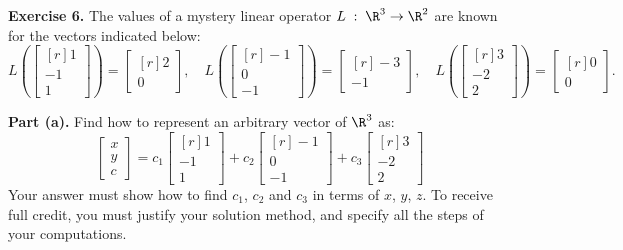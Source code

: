 \documentclass[12pt]{article}
\begin{document}
\textbf{Exercise 6.} The values of a mystery linear operator $L\;:\;\R^3\to\R^2$ are known for the vectors indicated below:
\[
L\left(\begin{bmatrix*}[r] 1\\ -1\\ 1\end{bmatrix*}\right)=\begin{bmatrix*}[r] 2\\ 0\end{bmatrix*},\quad
L\left(\begin{bmatrix*}[r] -1\\ 0\\-1\end{bmatrix*}\right)=\begin{bmatrix*}[r] -3\\ -1\end{bmatrix*},\quad
L\left(\begin{bmatrix*}[r] 3\\ -2\\ 2\end{bmatrix*}\right)=\begin{bmatrix*}[r] 0\\ 0\end{bmatrix*}.
\]

\textbf{Part (a).} Find how to represent an arbitrary vector of $\R^3$ as:
\[
\begin{bmatrix}x\\y\\c\end{bmatrix}=
c_1\begin{bmatrix*}[r] 1\\ -1\\ 1\end{bmatrix*}+
c_2\begin{bmatrix*}[r] -1\\ 0\\-1\end{bmatrix*}+
c_3\begin{bmatrix*}[r] 3\\ -2\\ 2\end{bmatrix*}
\]
Your answer must show how to find $c_1$, $c_2$ and $c_3$ in terms of $x$, $y$, $z$. To receive full credit, you must justify your solution method, and specify all the steps of your computations.
\end{document}
